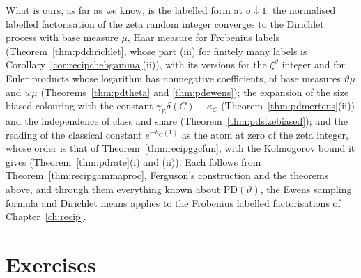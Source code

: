 What is ours, as far as we know, is the labelled form at $\sigma\downarrow1$: the normalised labelled factorisation of the zeta random integer converges to the Dirichlet process with base measure $\mu$, Haar measure for Frobenius labels (Theorem~\ref{thm:pddirichlet}, whose part (iii) for finitely many labels is Corollary~\ref{cor:recipchebgamma}(ii)), with its versions for the $\zeta^\vartheta$ integer and for Euler products whose logarithm has nonnegative coefficients, of base measures $\vartheta\mu$ and $w\mu$ (Theorems~\ref{thm:pdtheta} and \ref{thm:pdewens}); the expansion of the size biased colouring with the constant $\gamma_{\mathrm E}\delta(C)-\kappa_C$ (Theorem~\ref{thm:pdmertens}(ii)) and the independence of class and share (Theorem~\ref{thm:pdsizebiased}); and the reading of the classical constant $e^{-h_C(1)}$ as the atom at zero of the zeta integer, whose order is that of Theorem~\ref{thm:recipggcfun}, with the Kolmogorov bound it gives (Theorem~\ref{thm:pdrate}(i) and (ii)). Each follows from Theorem~\ref{thm:recipgammaproc}, Ferguson's construction and the theorems above, and through them everything known about $\mathrm{PD}(\vartheta)$, the Ewens sampling formula and Dirichlet means applies to the Frobenius labelled factorisations of Chapter~\ref{ch:recip}.

\section{Exercises}

